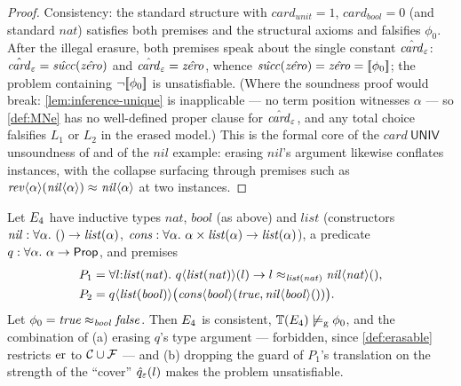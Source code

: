 \begin{proof}
  Consistency: the standard structure with
  $\mathit{card}_{\mathit{unit}} = 1$,
  $\mathit{card}_{\mathit{bool}} = 0$ (and standard $\mathit{nat}$)
  satisfies both premises and the structural axioms and falsifies
  $\phi_0$.  After the illegal erasure, both premises speak about the
  single constant $\hat{\mathit{card}}_{\varepsilon}$:
  $\hat{\mathit{card}}_{\varepsilon} = \hat{\mathit{succ}}(\hat{\mathit{zero}})$
  and $\hat{\mathit{card}}_{\varepsilon} = \hat{\mathit{zero}}$, whence
  $\hat{\mathit{succ}}(\hat{\mathit{zero}}) = \hat{\mathit{zero}} =
  [\![ \phi_0 ]\!]$; the problem containing $\neg[\![ \phi_0 ]\!]$ is
  unsatisfiable.  (Where the soundness proof would break:
  \cref{lem:inference-unique} is inapplicable --- no term position
  witnesses $\alpha$ --- so \cref{def:MNe} has no well-defined proper
  clause for $\hat{\mathit{card}}_{\varepsilon}$, and any total choice falsifies
  $L_1$ or $L_2$ in the erased model.)  This is the formal core of the
  $\mathit{card}\ \mathsf{UNIV}$ unsoundness of
  \cite{MengPaulson2008} and of the $\mathit{nil}$ example: erasing
  $\mathit{nil}$'s argument likewise conflates instances, with the
  collapse surfacing through premises such as
  $\mathit{rev}\langle\alpha\rangle(\mathit{nil}\langle\alpha\rangle)
  \approx_{} \mathit{nil}\langle\alpha\rangle$ at two instances.
\end{proof}

\begin{proposition}
  \label{prop:tight-pred-erasure}
  Let $E_4$ have inductive types $\mathit{nat}$, $\mathit{bool}$ (as
  above) and $\mathit{list}$ (constructors
  $\mathit{nil} : \forall\alpha.\ () \arr \mathit{list}(\alpha)$,
  $\mathit{cons} : \forall\alpha.\ \alpha \times \mathit{list}(\alpha)
  \rightarrow \mathit{list}(\alpha)$), a predicate
  $q : \forall\alpha.\ \alpha \rightarrow \mathsf{Prop}$, and premises
  \begin{align*}
    P_1 &= \forall l{:}\mathit{list}(\mathit{nat}).\
      q\langle \mathit{list}(\mathit{nat})\rangle(l) \rightarrow
      l \approx_{\mathit{list}(\mathit{nat})} \mathit{nil}\langle
      \mathit{nat}\rangle(), \\
    P_2 &= q\langle \mathit{list}(\mathit{bool})\rangle\bigl(
      \mathit{cons}\langle\mathit{bool}\rangle(\mathit{true},
      \mathit{nil}\langle\mathit{bool}\rangle())\bigr).
  \end{align*}
  Let $\phi_0 = \mathit{true} \approx_{\mathit{bool}} \mathit{false}$.  Then
  $E_4$ is consistent, $\mathbb{T}(E_4) \not\models_{\mathrm{g}} \phi_0$, and the
  combination
  of (a) erasing $q$'s type argument --- forbidden, since
  \cref{def:erasable} restricts $\mathrm{er}$ to $\mathcal{C} \cup \mathcal{F}$ --- and
  (b) dropping the guard of $P_1$'s translation on the strength of the
  ``cover'' $\hat q_{\varepsilon}(l)$ makes the problem unsatisfiable.
\end{proposition}


